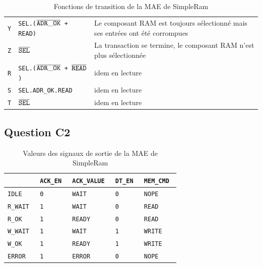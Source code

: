 \documentclass{article}
\begin{document}
\begin{table}[H]
\begin{tabular}{ | l | l | l | }
\texttt{Y}  &   \tt{SEL.($\overline{\tt{ADR\_OK}}$ + READ)                       } &
Le composant RAM est toujours sélectionné mais ses entrées ont été corrompues \\
\texttt{Z}  &   \tt{$\overline{\tt{SEL}}$                                        } &
La transaction se termine, le composant RAM n'est plus sélectionnée \\
\hline
\texttt{R}  &   \tt{SEL.($\overline{\tt{ADR\_OK}}$ + $\overline{\tt{READ}}$)          } &
idem en lecture \\
\texttt{S}  &   \tt{SEL.ADR\_OK.READ                                        } &
idem en lecture \\
\texttt{T}  &   \tt{$\overline{\tt{SEL}}$                                        } &
idem en lecture \\
\hline
\end{tabular}
\caption{Fonctions de transition de la MAE de SimpleRam}
\endgroup
\end{table}

       

\subsection{Question C2}

\begin{table}[H]
\centering
\begingroup
\setlength{\tabcolsep}{5pt}
\renewcommand{\arraystretch}{1.1}
\begin{tabular}{| l | l | l | l | l |}
\hline
                    & \tt{ACK\_EN}      & \tt{ACK\_VALUE}   & \tt{DT\_EN} & \tt{MEM\_CMD}   \\
\hline
\tt{IDLE}           & \tt{0}            & \tt{WAIT}         & \tt{0}      & \tt{NOPE}         \\
\tt{R\_WAIT}        & \tt{1}            & \tt{WAIT}         & \tt{0}      & \tt{READ}         \\
\tt{R\_OK}          & \tt{1}            & \tt{READY}        & \tt{0}      & \tt{READ}         \\
\tt{W\_WAIT}        & \tt{1}            & \tt{WAIT}         & \tt{1}      & \tt{WRITE}        \\
\tt{W\_OK}          & \tt{1}            & \tt{READY}        & \tt{1}      & \tt{WRITE}        \\
\tt{ERROR}          & \tt{1}            & \tt{ERROR}        & \tt{0}      & \tt{NOPE}         \\
\hline
\end{tabular}
\caption{Valeurs des signaux de sortie de la MAE de SimpleRam}
\endgroup
\end{table}
\end{document}
